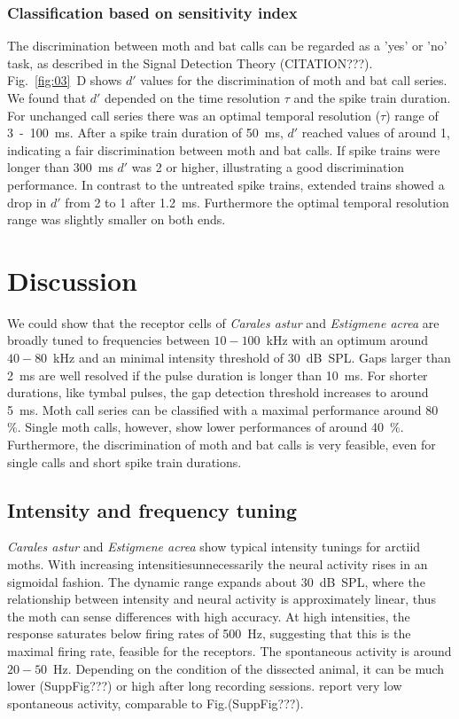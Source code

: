 \documentclass[12pt,a4paper]{article}
\newcommand{\species}[1]{\textit{#1}}
\newcommand{\percent}[1]{#1~$\%$}
\begin{document}
\subsubsection{Classification based on sensitivity index}
The discrimination between moth and bat calls can be regarded as a 'yes' or 'no' task, as described in the Signal Detection Theory (CITATION???).
Fig.~\ref{fig:03}~D shows $d'$ values for the discrimination of moth and bat call series. We found that $d'$ depended on the time resolution $\tau$ and the spike train duration. For unchanged call series there was an optimal temporal resolution ($ \tau $) range of 3~-~100~ms. After a spike train duration of 50~ms, $d'$ reached values of around 1, indicating a fair discrimination between moth and bat calls. If spike trains were longer than 300~ms $d'$ was 2 or higher, illustrating a good discrimination performance. In contrast to the untreated spike trains, extended trains showed a drop in $d'$ from 2 to 1 after 1.2~ms. Furthermore the optimal temporal resolution range was slightly smaller on both ends.

\newpage
\section{Discussion}
We could show that the receptor cells of \species{Carales astur} and \species{Estigmene acrea} are broadly tuned to frequencies between $10-100$~kHz with an optimum around $40-80$~kHz and an minimal intensity threshold of 30~dB~SPL. Gaps larger than 2~ms are well resolved if the pulse duration is longer than 10~ms. For shorter durations, like tymbal pulses, the gap detection threshold increases to around 5~ms. Moth call series can be classified with a maximal performance around \percent{80}. Single moth calls, however, show lower performances of around \percent{40}. Furthermore, the discrimination of moth and bat calls is very feasible, even for single calls and short spike train durations.

\subsection{Intensity and frequency tuning}
\species{Carales astur} and \species{Estigmene acrea} show typical  intensity tunings for arctiid moths. With increasing intensitiesunnecessarily the neural activity rises in an sigmoidal fashion. The dynamic range expands about 30~dB~SPL, where the relationship between intensity and neural activity is approximately linear, thus the moth can sense differences with high accuracy. At high intensities, the response saturates below firing rates of 500~Hz, suggesting that this is the maximal firing rate, feasible for the receptors. The spontaneous activity is around $20-50$~Hz. Depending on the condition of the dissected animal, it can be much lower (SuppFig???) or high after long recording sessions. \cite{fullard1998} report very low spontaneous activity, comparable to Fig.(SuppFig???). 
\end{document}
